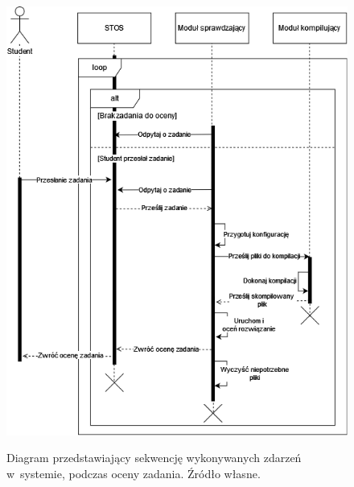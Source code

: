 \begin{figure}
	\begin{center}
		\resizebox{1.0\textwidth}{!} {
			\includegraphics{img/1/d_sek_1.png}
		}
		\caption[Diagram sekwencji komponentów]{Diagram przedstawiający sekwencję wykonywanych zdarzeń w~systemie, podczas oceny zadania. Źródło własne.}
	\end{center}
\end{figure}
